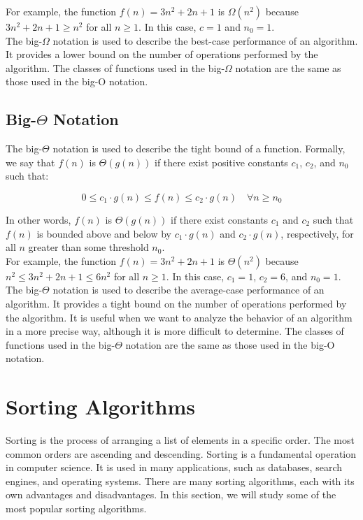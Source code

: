 For example, the function $f(n) = 3n^2 + 2n + 1$ is $\Omega(n^2)$ because $3n^2
+ 2n + 1 \geq n^2$ for all $n \geq 1$. In this case, $c = 1$ and $n_0 = 1$.\\

The big-$\Omega$ notation is used to describe the best-case performance of an
algorithm. It provides a lower bound on the number of operations performed by
the algorithm. The classes of functions used in the big-$\Omega$ notation are
the same as those used in the big-O notation.

\subsection{Big-$\Theta$ Notation}

The big-$\Theta$ notation is used to describe the tight bound of a function.
Formally, we say that $f(n)$ is $\Theta(g(n))$ if there exist positive constants
$c_1$, $c_2$, and $n_0$ such that:

\begin{equation}
    0 \leq c_1 \cdot g(n) \leq f(n) \leq c_2 \cdot g(n) \quad \forall n \geq n_0
\end{equation}

In other words, $f(n)$ is $\Theta(g(n))$ if there exist constants $c_1$ and
$c_2$ such that $f(n)$ is bounded above and below by $c_1 \cdot g(n)$ and $c_2
\cdot g(n)$, respectively, for all $n$ greater than some threshold $n_0$.\\

For example, the function $f(n) = 3n^2 + 2n + 1$ is $\Theta(n^2)$ because $n^2
\leq 3n^2 + 2n + 1 \leq 6n^2$ for all $n \geq 1$. In this case, $c_1 = 1$, $c_2
= 6$, and $n_0 = 1$.\\

The big-$\Theta$ notation is used to describe the average-case performance of
an algorithm. It provides a tight bound on the number of operations performed by
the algorithm. It is useful when we want to analyze the behavior of an algorithm
in a more precise way, although it is more difficult to determine. The classes of 
functions used in the big-$\Theta$ notation are the same as those used in the 
big-O notation.

\section{Sorting Algorithms}

Sorting is the process of arranging a list of elements in a specific order. The
most common orders are ascending and descending. Sorting is a fundamental
operation in computer science. It is used in many applications, such as
databases, search engines, and operating systems. There are many sorting
algorithms, each with its own advantages and disadvantages. In this section, we
will study some of the most popular sorting algorithms.

